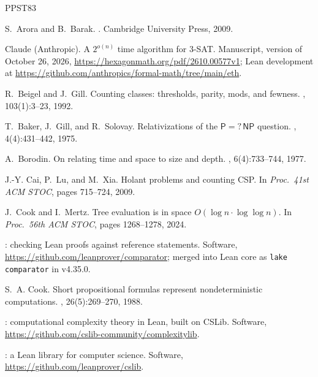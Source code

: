 \documentclass[11pt]{article}
\theoremstyle{definition}
\theoremstyle{definition}
\theoremstyle{remark}
\begin{document}
\begin{thebibliography}{PPST83}\small\setlength{\itemsep}{1.5pt}

S.~Arora and B.~Barak.
.
\newblock Cambridge University Press, 2009.

Claude (Anthropic).
\newblock A $2^{o(n)}$ time algorithm for 3-SAT.
\newblock Manuscript, version of October 26, 2026, \url{https://hexagonmath.org/pdf/2610.00577v1}; Lean development at \url{https://github.com/anthropics/formal-math/tree/main/eth}.

R.~Beigel and J.~Gill.
\newblock Counting classes: thresholds, parity, mods, and fewness.
, 103(1):3--23, 1992.

T.~Baker, J.~Gill, and R.~Solovay.
\newblock Relativizations of the $\mathsf P=?\,\mathsf{NP}$ question.
, 4(4):431--442, 1975.

A.~Borodin.
\newblock On relating time and space to size and depth.
, 6(4):733--744, 1977.

J.-Y. Cai, P.~Lu, and M.~Xia.
\newblock Holant problems and counting {CSP}.
\newblock In {\em Proc.\ 41st ACM STOC}, pages 715--724, 2009.

J.~Cook and I.~Mertz.
\newblock Tree evaluation is in space ${O}(\log n\cdot\log\log n)$.
\newblock In {\em Proc.\ 56th ACM STOC}, pages 1268--1278, 2024.

: checking {L}ean proofs against reference statements.
\newblock Software, \url{https://github.com/leanprover/comparator}; merged into Lean core as \texttt{lake comparator} in v4.35.0.

S.~A. Cook.
\newblock Short propositional formulas represent nondeterministic computations.
, 26(5):269--270, 1988.

: computational complexity theory in {L}ean, built on {CSLib}.
\newblock Software, \url{https://github.com/cslib-community/complexitylib}.

: a {L}ean library for computer science.
\newblock Software, \url{https://github.com/leanprover/cslib}.


\end{thebibliography}
\end{document}
